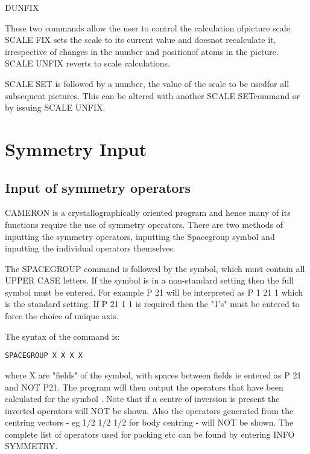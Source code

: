 \documentclass[10pt,a4paper]{report}
\begin{document}
DUNFIX

These two commands allow the user to control the calculation ofpicture scale. SCALE FIX sets the scale to its current value and doesnot recalculate it, irrespective of changes in the number and positionof atoms in the picture. SCALE UNFIX reverts to scale calculations.

\bigskip{}

SCALE SET is followed by a number, the value of the scale to be usedfor all subsequent pictures. This can be altered with another SCALE SETcommand or by issuing SCALE UNFIX.

\chapter{Symmetry Input}
\section{Input of symmetry operators}


CAMERON is a crystallographically oriented program and hence
many of
its functions require the use of symmetry operators. There are
two
methods of inputting the symmetry operators, inputting the
Spacegroup
symbol and inputting the individual operators themselves.


\bigskip{}




The SPACEGROUP command is followed by the symbol, which must
contain
all UPPER CASE letters. If the symbol is in a non-standard
setting then
the full symbol must be entered. For example  P 21 will be
interpreted
as P 1 21 1 which is the standard setting. If P 21 1 1 is
required then
the "1's" must be entered to force the choice of unique axis.


The syntax of the command is:
\small\begin{verbatim}
SPACEGROUP X X X X
\end{verbatim}\normalsize


where X are "fields" of the symbol, with spaces between fields
ie
entered as P 21 and NOT P21. The program will then output the
operators
that have been calculated for the symbol . Note that if a centre
of
inversion is present the inverted operators will NOT be shown.
Also the
operators generated from the centring vectors - eg 1/2 1/2 1/2
for body
centring - will NOT be shown. The complete list of operators used
for
packing etc can be found by entering INFO SYMMETRY.
\end{document}
